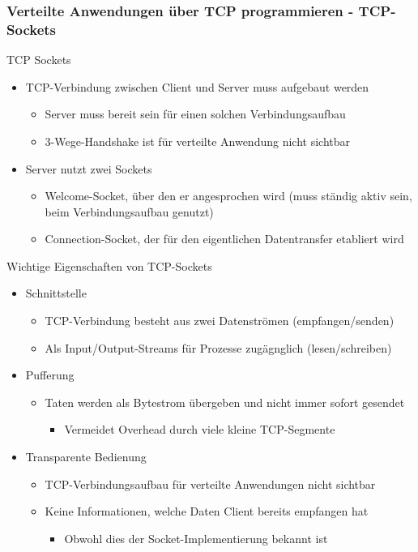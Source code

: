     \subsubsection{Verteilte Anwendungen über TCP programmieren - TCP-Sockets}
      TCP Sockets
      \begin{itemize}
        \item TCP-Verbindung zwischen Client und Server muss aufgebaut werden
          \begin{itemize}
            \item Server muss bereit sein für einen solchen Verbindungsaufbau
            \item 3-Wege-Handshake ist für verteilte Anwendung nicht sichtbar
          \end{itemize}
        \item Server nutzt zwei Sockets
          \begin{itemize}
            \item Welcome-Socket, über den er angesprochen wird (muss ständig aktiv sein, beim
              Verbindungsaufbau genutzt)
            \item Connection-Socket, der für den eigentlichen Datentransfer etabliert wird
          \end{itemize}
      \end{itemize}
      Wichtige Eigenschaften von TCP-Sockets
      \begin{itemize}
        \item Schnittstelle
          \begin{itemize}
            \item TCP-Verbindung besteht aus zwei Datenströmen (empfangen/senden)
            \item Als Input/Output-Streams für Prozesse zugägnglich (lesen/schreiben)
          \end{itemize}
        \item Pufferung
          \begin{itemize}
            \item Taten werden als Bytestrom übergeben und nicht immer sofort gesendet
              \begin{itemize}
                \item Vermeidet Overhead durch viele kleine TCP-Segmente
              \end{itemize}
          \end{itemize}
        \item Transparente Bedienung
          \begin{itemize}
            \item TCP-Verbindungsaufbau für verteilte Anwendungen nicht sichtbar
            \item Keine Informationen, welche Daten Client bereits empfangen hat
              \begin{itemize}
                \item Obwohl dies der Socket-Implementierung bekannt ist
              \end{itemize}
          \end{itemize}
      \end{itemize}
